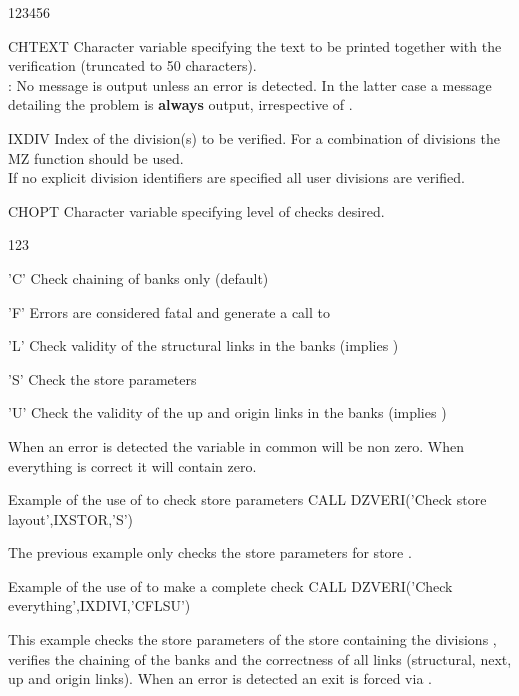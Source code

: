 \begin{DLtt}{123456}
\item[CHTEXT]Character variable specifying the text to be printed
together with the verification (truncated to 50 characters).\\
: No message is output unless an error is detected.
In the latter case a message detailing the problem is
{\bf always} output, irrespective of .
\item[IXDIV]Index of the division(s) to be verified.
\newline For a combination of divisions the MZ function  should
be used.\\
If no explicit division identifiers are specified
all user divisions are verified.
\item[CHOPT]Character variable specifying level of checks desired.
\begin{DLtt}{123}
\item['C']Check chaining of banks only (default)
\item['F']Errors are considered fatal and generate a call to 
\item['L']Check validity of the structural links in the banks
(implies )
\item['S']Check the store parameters
\item['U']Check the validity of the up and origin links in the banks
(implies )
\end{DLtt}
\end{DLtt}

When an error is detected the variable  in common \Lit{/\QUEST/}
will be non zero. When everything is correct it will contain zero.

\begin{XMPt}{Example of the use of  to check store parameters}
     CALL DZVERI('Check store layout',IXSTOR,'S')
\end{XMPt}
The previous example only checks the store parameters for store .
\begin{XMPt}{Example of the use of  to make a complete check}
     CALL DZVERI('Check everything',IXDIVI,'CFLSU')
\end{XMPt}
This example checks the store parameters of the store containing
the divisions ,
verifies the chaining of the banks and the correctness of all
links (structural, next, up and origin links). When an error is
detected an exit is forced via .

